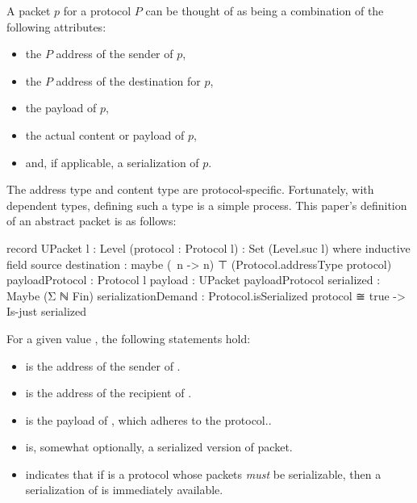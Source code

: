 \documentclass{report}
\begin{document}
\begin{itemize}
A packet \(p\) for a protocol \(P\) can be thought of as being a combination of the following attributes:
\begin{itemize}
	\item the \(P\) address of the sender of \(p\),
	\item the \(P\) address of the destination for \(p\),
	\item the payload of \(p\),
	\item the actual content or payload of \(p\),
	\item and, if applicable, a serialization of \(p\).
\end{itemize}

The address type and content type are protocol-specific.  Fortunately, with dependent types, defining such a type is a simple process.  This paper's definition of an abstract packet is as follows:

\begin{code}
    record UPacket {l : Level} (protocol : Protocol l) : Set (Level.suc l) where
      inductive
      field
        source
         destination : maybe (\ n -> n) ⊤ (Protocol.addressType protocol)
        payloadProtocol : Protocol l
        payload : UPacket payloadProtocol
        serialized : Maybe (Σ ℕ Fin)
        serializationDemand  : Protocol.isSerialized protocol ≅ true
                            -> Is-just serialized
\end{code}

For a given   value , the following statements hold:
\begin{itemize}
	\item {}  is the address of the sender of .
	\item {}  is the address of the recipient of .
	\item {}  is the payload of , which adheres to the   protocol..
	\item {}  is, somewhat optionally, a serialized version of packet.
	\item {}  indicates that if  is a protocol whose packets \emph{must} be serializable, then a serialization of  is immediately available.
\end{itemize}


\end{itemize}
\end{document}

